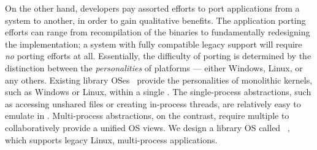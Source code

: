 On the other hand, developers pay assorted efforts to port applications
from a system to another,
in order to gain qualitative benefits.
The application porting efforts can range from
recompilation of the binaries
to fundamentally redesigning the implementation;
a system with fully compatible legacy support will require \emph{no} porting efforts at all.
Essentially,
the difficulty of porting is determined by the distinction between the \emph{personalities} of platforms
--- either Windows, Linux, \liboses{} or any others.
Existing library OSes~\citep{porter11drawbridge, baumann13bascule, baumann14haven}
provide the personalities of monolithic kernels, such as Windows or Linux,
within a single \picoproc{}.
The single-process abstractions,
such as accessing unshared files or creating in-process threads,
are relatively easy to emulate in \liboses{}.
Multi-process abstractions, on the contrast, require
multiple \picoprocs{} to collaboratively provide a unified OS views.
We design a library OS called \term{\graphene{}}~\citep{tsai14graphene},
which supports legacy Linux, multi-process applications.
